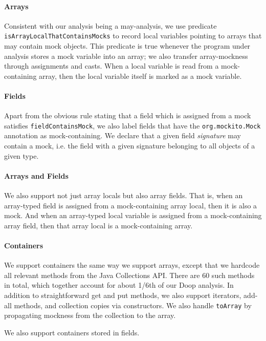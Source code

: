 \paragraph{Arrays} Consistent with our analysis being a may-analysis, we use predicate {\tt isArrayLocalThatContainsMocks} to record local variables pointing to arrays that may contain mock objects. This predicate is true whenever the program under analysis stores a mock variable into an array; we also transfer array-mockness through assignments and casts. When a local variable is read from a mock-containing array, then the local variable itself is marked as a mock variable.

\paragraph{Fields} Apart from the obvious rule stating that a field which is assigned from a mock satisfies {\tt fieldContainsMock}, we also label fields that have the {\tt org.mockito.Mock} annotation as mock-containing. We declare that a given field \emph{signature} may contain a mock, i.e. the field with a given signature belonging to all objects of a given type.

\paragraph{Arrays and Fields} We also support not just array locals but also array fields. That is, when an array-typed field is assigned from a mock-containing array local, then it is also a mock. And when an array-typed local variable is assigned from a mock-containing array field, then that array local is a mock-containing array.

\paragraph{Containers} We support containers the same way we support arrays, except that we hardcode all relevant methods from the Java Collections API. There are 60 such methods in total, which together account for about 1/6th of our Doop analysis. In addition to straightforward get and put methods, we also support iterators, add-all methods, and collection copies via constructors. We also handle {\tt toArray} by propagating mockness from the collection to the array.

We also support containers stored in fields.
